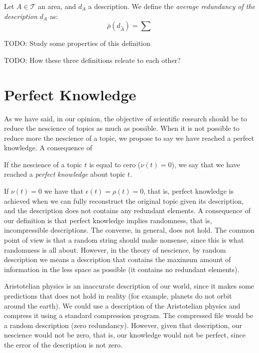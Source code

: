 \begin{definition}
Let $A \in \mathcal{T}$ an area, and $d_A$ a description. We define the \emph{average redundancy of the description} $d_A$ as:
\[
\bar{\rho}(d_{\hat{A}}) = \sum
\]
\end{definition}

{\color{red} TODO: Study some properties of this definition}

{\color{red} TODO: How these three definitions releate to each other?}


%
%

\section{Perfect Knowledge}

As we have said, in our opinion, the objective of scientific research should be to reduce the nescience of topics as much as possible. When it is not possible to reduce more the nescience of a topic, we propose to say we have reached a perfect knowledge. A consequence of 

\begin{definition}
If the nescience of a topic $t$ is equal to cero ($\nu(t)=0$), we say that we have reached a \emph{perfect knowledge} about topic $t$.
\end{definition}

If $\nu(t)=0$ we have that $\epsilon(t) = \rho(t) = 0$, that is, perfect knowledge is achieved when we can fully reconstruct the original topic given its description, and the description does not contains any redundant elements. A consequence of our definition is that perfect knowledge implies randomness, that is, incompressible descriptions. The converse, in general, does not hold. The common point of view is that a random string should make nonsense, since this is what randomness is all about. However, in the theory of nescience, by random description we means a description that contains the maximum amount of information in the less space as possible (it contains no redundant elements).

\begin{example}
Aristotelian physics is an inaccurate description of our world, since it makes some predictions that does not hold in reality (for example, planets do not orbit around the earth). We could use a description of the Aristotelian physics and compress it using a standard compression program. The compressed file would be a random description (zero redundancy). However, given that description, our nescience would not be zero, that is, our knowledge would not be perfect, since the error of the description is not zero.
\end{example}

